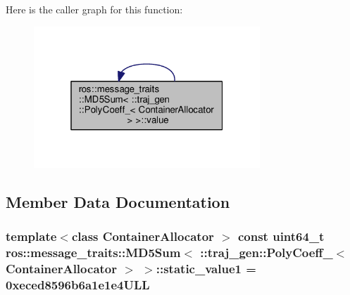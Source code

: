Here is the caller graph for this function\+:
\nopagebreak
\begin{figure}[H]
\begin{center}
\leavevmode
\includegraphics[width=241pt]{structros_1_1message__traits_1_1_m_d5_sum_3_01_1_1traj__gen_1_1_poly_coeff___3_01_container_allocator_01_4_01_4_adfae6c311b53d8d7863c27467dfff8d7_icgraph}
\end{center}
\end{figure}




\subsection{Member Data Documentation}
\subsubsection[{\texorpdfstring{static\+\_\+value1}{static_value1}}]{\setlength{\rightskip}{0pt plus 5cm}template$<$class Container\+Allocator $>$ const uint64\+\_\+t ros\+::message\+\_\+traits\+::\+M\+D5\+Sum$<$ \+::{\bf traj\+\_\+gen\+::\+Poly\+Coeff\+\_\+}$<$ Container\+Allocator $>$ $>$\+::static\+\_\+value1 = 0xeced8596b6a1e1e4\+U\+LL\hspace{0.3cm}{\ttfamily [static]}}\hypertarget{structros_1_1message__traits_1_1_m_d5_sum_3_01_1_1traj__gen_1_1_poly_coeff___3_01_container_allocator_01_4_01_4_a706a0d19edc1e075167c4d1c8d2cdaa8}{}\label{structros_1_1message__traits_1_1_m_d5_sum_3_01_1_1traj__gen_1_1_poly_coeff___3_01_container_allocator_01_4_01_4_a706a0d19edc1e075167c4d1c8d2cdaa8}


